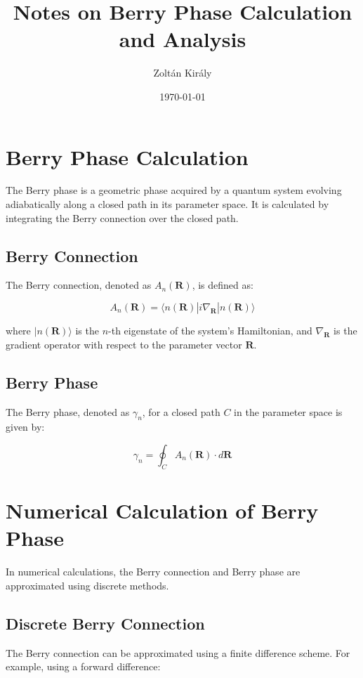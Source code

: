 \documentclass{article}
\title{Notes on Berry Phase Calculation and Analysis}
\author{Zoltán Király}
\date{\today}
\begin{document}
\maketitle

\section{Berry Phase Calculation}

The Berry phase is a geometric phase acquired by a quantum system evolving adiabatically along a closed path in its parameter space. It is calculated by integrating the Berry connection over the closed path.

\subsection{Berry Connection}

The Berry connection, denoted as $A_n(\mathbf{R})$, is defined as:

$$
A_n(\mathbf{R}) = \langle n(\mathbf{R}) | i \nabla_\mathbf{R} | n(\mathbf{R}) \rangle
$$

where $|n(\mathbf{R})\rangle$ is the $n$-th eigenstate of the system's Hamiltonian, and $\nabla_\mathbf{R}$ is the gradient operator with respect to the parameter vector $\mathbf{R}$.

\subsection{Berry Phase}

The Berry phase, denoted as $\gamma_n$, for a closed path $C$ in the parameter space is given by:

$$
\gamma_n = \oint_C A_n(\mathbf{R}) \cdot d\mathbf{R}
$$

\section{Numerical Calculation of Berry Phase}

In numerical calculations, the Berry connection and Berry phase are approximated using discrete methods.

\subsection{Discrete Berry Connection}

The Berry connection can be approximated using a finite difference scheme. For example, using a forward difference:
\end{document}
